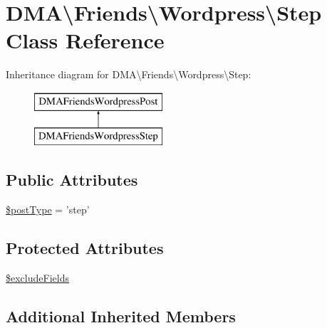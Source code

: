 \hypertarget{classDMA_1_1Friends_1_1Wordpress_1_1Step}{\section{D\-M\-A\textbackslash{}Friends\textbackslash{}Wordpress\textbackslash{}Step Class Reference}
\label{classDMA_1_1Friends_1_1Wordpress_1_1Step}
}
Inheritance diagram for D\-M\-A\textbackslash{}Friends\textbackslash{}Wordpress\textbackslash{}Step\-:\begin{figure}[H]
\begin{center}
\leavevmode
\includegraphics[height=2.000000cm]{d0/d87/classDMA_1_1Friends_1_1Wordpress_1_1Step}
\end{center}
\end{figure}
\subsection*{Public Attributes}
\begin{DoxyCompactItemize}
\item 
\hyperlink{classDMA_1_1Friends_1_1Wordpress_1_1Step_abaa142e178d837a810e5048af7f36497}{\$post\-Type} = 'step'
\end{DoxyCompactItemize}
\subsection*{Protected Attributes}
\begin{DoxyCompactItemize}
\item 
\hyperlink{classDMA_1_1Friends_1_1Wordpress_1_1Step_aa320e2b0f3f4a24c3cea41e133fd1145}{\$exclude\-Fields}
\end{DoxyCompactItemize}
\subsection*{Additional Inherited Members}


